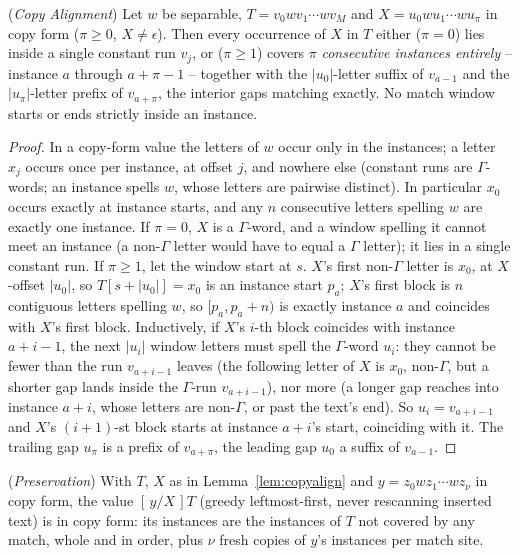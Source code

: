 \documentclass[runningheads,envcountsect]{llncs}
\begin{document}
\begin{lemma}
    (\emph{Copy Alignment})
    \label{lem:copyalign}
    Let $w$ be separable, $T = v_0 w v_1 \cdots w v_M$ and $X = u_0 w u_1 \cdots w u_{\pi}$ in copy form ($\pi \geq 0$, $X \neq \epsilon$). Then every occurrence of $X$ in $T$ either ($\pi = 0$) lies inside a single constant run $v_j$, or ($\pi \geq 1$) covers $\pi$ \emph{consecutive instances entirely} -- instance $a$ through $a + \pi - 1$ -- together with the $|u_0|$-letter suffix of $v_{a-1}$ and the $|u_\pi|$-letter prefix of $v_{a+\pi}$, the interior gaps matching exactly. No match window starts or ends strictly inside an instance.
\end{lemma}

\begin{proof}
    In a copy-form value the letters of $w$ occur only in the instances; a letter $x_j$ occurs once per instance, at offset $j$, and nowhere else (constant runs are $\Gamma$-words; an instance spells $w$, whose letters are pairwise distinct). In particular $x_0$ occurs exactly at instance starts, and any $n$ consecutive letters spelling $w$ are exactly one instance. If $\pi = 0$, $X$ is a $\Gamma$-word, and a window spelling it cannot meet an instance (a non-$\Gamma$ letter would have to equal a $\Gamma$ letter); it lies in a single constant run. If $\pi \geq 1$, let the window start at $s$. $X$'s first non-$\Gamma$ letter is $x_0$, at $X$-offset $|u_0|$, so $T[s + |u_0|] = x_0$ is an instance start $p_a$; $X$'s first block is $n$ contiguous letters spelling $w$, so $[p_a, p_a + n)$ is exactly instance $a$ and coincides with $X$'s first block. Inductively, if $X$'s $i$-th block coincides with instance $a + i - 1$, the next $|u_i|$ window letters must spell the $\Gamma$-word $u_i$: they cannot be fewer than the run $v_{a+i-1}$ leaves (the following letter of $X$ is $x_0$, non-$\Gamma$, but a shorter gap lands inside the $\Gamma$-run $v_{a+i-1}$), nor more (a longer gap reaches into instance $a+i$, whose letters are non-$\Gamma$, or past the text's end). So $u_i = v_{a+i-1}$ and $X$'s $(i{+}1)$-st block starts at instance $a+i$'s start, coinciding with it. The trailing gap $u_\pi$ is a prefix of $v_{a+\pi}$, the leading gap $u_0$ a suffix of $v_{a-1}$.
\end{proof}

\begin{lemma}
    (\emph{Preservation})
    \label{lem:preserve}
    With $T$, $X$ as in Lemma~\ref{lem:copyalign} and $y = z_0 w z_1 \cdots w z_\nu$ in copy form, the value $[\,y/X\,]T$ (greedy leftmost-first, never rescanning inserted text) is in copy form: its instances are the instances of $T$ not covered by any match, whole and in order, plus $\nu$ fresh copies of $y$'s instances per match site.
\end{lemma}
\end{document}
